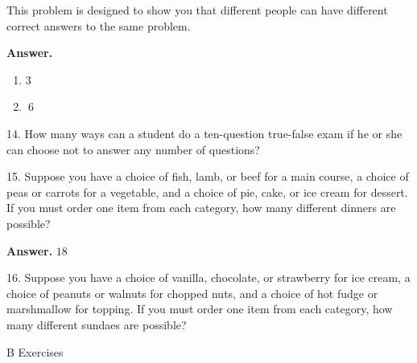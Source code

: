\documentclass[10pt,]{book}
\theoremstyle{plain}
\theoremstyle{definition}
\theoremstyle{definition}
\theoremstyle{definition}
\begin{document}
\begin{exercisegroup}
This problem is designed to show you that different people can have different correct answers to the same problem.%
\par\smallskip
\par\smallskip
\noindent\textbf{Answer.}\hypertarget{answer-7}{}\quad
\leavevmode%
\begin{multicols}{2}
\begin{enumerate}[label=\alph*]
\item\hypertarget{li-8}{}\(3\)%
\item\hypertarget{li-9}{}\(\ 6\)%
\end{enumerate}
\end{multicols}
%
\item[14.]\hypertarget{exercise-14}{}How many ways can a student do a ten-question true-false exam if he or she can choose not to answer any number of questions?%
\par\smallskip
\item[15.]\hypertarget{exercise-15}{} Suppose you have a choice of fish, lamb, or beef for a main course, a choice of peas or carrots for a vegetable, and a choice of pie, cake, or ice cream for dessert. If you must order one item from each category, how many different dinners are possible?%
\par\smallskip
\par\smallskip
\noindent\textbf{Answer.}\hypertarget{answer-8}{}\quad
\(18\)%
\item[16.]\hypertarget{exercise-16}{} Suppose you have a choice of vanilla, chocolate, or strawberry for ice cream, a choice of peanuts or walnuts for chopped nuts, and a choice of hot fudge or marshmallow for topping. If you must order one item from each category, how many different sundaes are possible?%
\par\smallskip
\end{exercisegroup}
\par\smallskip\noindent
\hypertarget{exercisegroup-2}{}\typeout{************************************************}
\typeout{************************************************}
B Exercises%
\end{document}
